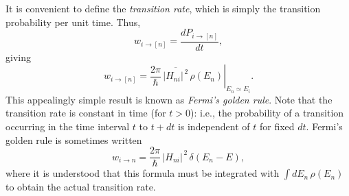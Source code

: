 It is convenient to define the {\em transition rate}, which is simply
the transition probability  per unit time. Thus,
\begin{equation}
w_{i\rightarrow [n]} = \frac{d P_{i\rightarrow [n]}}{dt},
\end{equation}
giving
\begin{equation}\label{e6.222}
w_{i\rightarrow [n]} = \left.\frac{2\pi}{\hbar}\, \overline{|H_{ni}|^{\,2}} 
\,\rho(E_n)
\right|_{E_n\simeq E_i}.
\end{equation}
This appealingly simple result is known as {\em Fermi's golden rule}. 
Note that the transition rate is constant in time (for $t>0$):
{\rm i.e.}, the probability of a transition occurring in the time interval
$t$ to $t+dt$ is independent of $t$ for fixed $dt$. 
Fermi's golden rule is sometimes written
\begin{equation}\label{e6.222a}
 w_{i\rightarrow n} = \frac{2\pi}{\hbar} \,|H_{ni}|^{\,2}\,
\delta(E_n - E),
\end{equation}
where it is understood that this formula must be  integrated 
with $\int dE_n\,\rho(E_n)$ to obtain the actual transition rate. 

